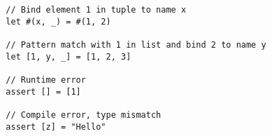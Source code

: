 \begin{lstlisting}
  // Bind element 1 in tuple to name x
  let #(x, _) = #(1, 2)

  // Pattern match with 1 in list and bind 2 to name y
  let [1, y, _] = [1, 2, 3]  

  // Runtime error
  assert [] = [1]

  // Compile error, type mismatch
  assert [z] = "Hello"
\end{lstlisting}












